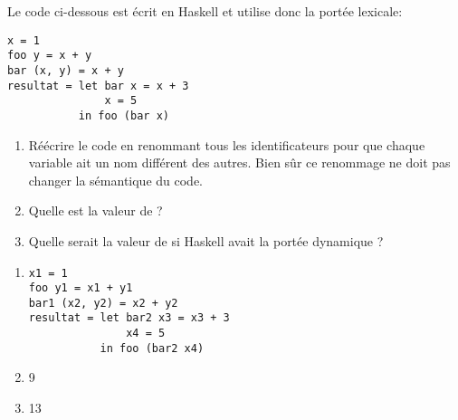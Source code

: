 \begin{Exercise}
\label{ex:variable_alpha}
Le code ci-dessous est écrit en Haskell et utilise donc la portée lexicale:
\begin{verbatim}
x = 1
foo y = x + y
bar (x, y) = x + y
resultat = let bar x = x + 3
               x = 5
           in foo (bar x)
\end{verbatim}

\begin{enumerate}
\item Réécrire le code en renommant tous les identificateurs pour que chaque
variable ait un nom différent des autres. Bien sûr ce renommage ne
doit pas changer la sémantique du code.


\item Quelle est la valeur de  ?
\item Quelle serait la valeur de  si Haskell
  avait la portée dynamique ?
\end{enumerate}
\end{Exercise}

\begin{Answer}[ref={ex:variable_alpha}]
  \begin{enumerate}
  \item
    \begin{verbatim}
x1 = 1
foo y1 = x1 + y1
bar1 (x2, y2) = x2 + y2
resultat = let bar2 x3 = x3 + 3
               x4 = 5
           in foo (bar2 x4)
         \end{verbatim}
       \item 9
         
       \item 13

         
    \end{enumerate}
\end{Answer}